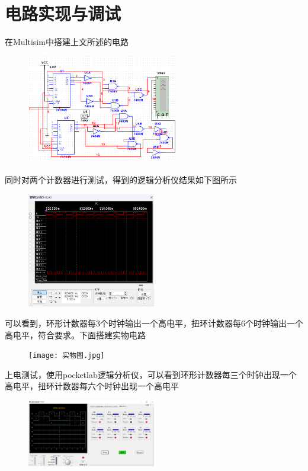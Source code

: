 \documentclass{ctexart}
\begin{document}
\section{电路实现与调试}
在Multisim中搭建上文所述的电路
\begin{figure}[H]
    \centering
    \includegraphics[width=0.6\textwidth]{multisim.png}
\end{figure}
同时对两个计数器进行测试，得到的逻辑分析仪结果如下图所示
\begin{figure}[H]
    \centering
    \includegraphics[width=0.5\textwidth]{逻辑分析仪.png}
\end{figure}
可以看到，环形计数器每3个时钟输出一个高电平，扭环计数器每6个时钟输出一个高电平，符合要求。下面搭建实物电路
\begin{figure}[H]
    \centering
    \texttt{[image: 实物图.jpg]}
\end{figure}
上电测试，使用pocketlab逻辑分析仪，可以看到环形计数器每三个时钟出现一个高电平，扭环计数器每六个时钟出现一个高电平
\begin{figure}[H]
    \centering
    \includegraphics[width=0.5\textwidth]{pocketlab.png}
\end{figure}
\end{document}
